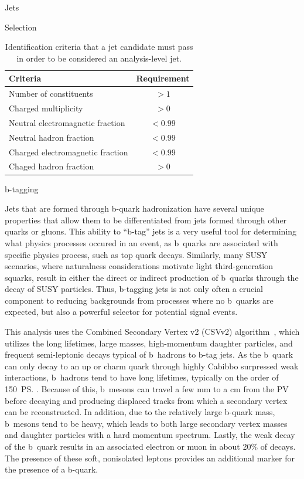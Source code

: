 \begin{section}{Jets}
\begin{subsection}{Selection}
\begin{table}[tb!]
\centering
\begin{tabular}{l|c}
\hline \hline
Criteria                          &  Requirement \\
\hline
Number of constituents            &  $> 1$       \\
Charged multiplicity              &  $> 0$       \\
Neutral electromagnetic fraction  &  $< 0.99$    \\
Neutral hadron fraction           &  $< 0.99$    \\
Charged electromagnetic fraction  &  $< 0.99$    \\
Chaged hadron fraction            &  $> 0$       \\
\hline\hline
\end{tabular}
\caption{Identification criteria that a jet candidate must pass in order to be considered an analysis-level jet.}
\label{tab:jet_id}
\end{table}

\end{subsection}

\begin{subsection}{b-tagging}

Jets that are formed through b-quark hadronization have several unique properties that allow them to be differentiated from jets formed through other quarks or gluons.
This ability to ``b-tag'' jets is a very useful tool for determining what physics processes occured in an event, as b~quarks are associated with specific physics process, such as top quark decays.
Similarly, many SUSY scenarios, where naturalness considerations motivate light third-generation squarks, result in either the direct or indirect production of b~quarks through the decay of SUSY particles.
Thus, b-tagging jets is not only often a crucial component to reducing backgrounds from processes where no b~quarks are expected, but also a powerful selector for potential signal events. 

This analysis uses the Combined Secondary Vertex v2 (CSVv2) algorithm~\cite{Chatrchyan:2012jua,Sirunyan:2017ezt}, which utilizes the long lifetimes, large masses, high-momentum daughter particles, and frequent semi-leptonic decays typical of b~hadrons to b-tag jets.
As the b~quark can only decay to an up or charm quark through highly Cabibbo surpressed weak interactions, b~hadrons tend to have long lifetimes, typically on the order of 150~\ps.
Because of this, b~mesons can travel a few mm to a cm from the PV before decaying and producing displaced tracks from which a secondary vertex can be reconstructed.
In addition, due to the relatively large b-quark mass, b~mesons tend to be heavy, which leads to both large secondary vertex masses and daughter particles with a hard momentum spectrum.
Lastly, the weak decay of the b~quark results in an associated electron or muon in about 20\% of decays.
The presence of these soft, nonisolated leptons provides an additional marker for the presence of a b-quark.


\end{subsection}
\end{section}
